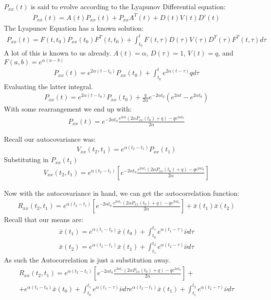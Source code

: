 \documentclass{article}
\begin{document}
$P_{xx}(t)$ is said to evolve according to the Lyapunov Differential equation:
\begin{align*}
\dot{P}_{xx}(t) = A(t)P_{xx}(t) + P_{xx}A^{T}(t) + D(t)V(t)D'(t)
\end{align*}
The Lyapunov Equation has a known solution:
\begin{align*}
P_{xx}(t) = F(t,t_0)P_{xx}(t_0)F^{T}(t,t_0) + \int_{t_0}^{t} F(t,\tau) D(\tau) V(\tau) D^T(\tau) F^T(t,\tau) d\tau
\end{align*}
A lot of this is known to us already. $A(t)=\alpha$, $D(\tau)=1$, $V(t)=q$, and $F(a,b)=e^{\alpha (a-b)}$
\begin{align*}
P_{xx}(t) = e^{2 \alpha (t-t_0)} P_{xx}(t_0) + \int_{t_0}^{t} e^{2 \alpha (t-\tau)} q d\tau
\end{align*}
Evaluating the latter integral.
\begin{align*}
P_{xx}(t) = e^{2 \alpha (t-t_0)} P_{xx}(t_0) + \frac{q}{2\alpha} e^{-2\alpha t_0} (e^{2\alpha t} - e^{2\alpha t_0})
\end{align*}
With some rearrangement we end up with:
\begin{align*}
P_{xx}(t) = e^{-2\alpha t_0} \frac{e^{2\alpha t} (2\alpha P_{xx}(t_0) + q) - q e^{2\alpha t_0}}{2\alpha}
\end{align*}



Recall our autocovariance was:
\begin{align*}
V_{xx}(t_2,t_1) = e^{\alpha (t_2-t_1)} P_{xx}(t_1)
\end{align*}
Substituting in $P_{xx}(t_1)$
\begin{align*}
V_{xx}(t_2,t_1) =  e^{\alpha (t_2-t_1)} [e^{-2\alpha t_0} \frac{e^{2\alpha t_1} (2\alpha P_{xx}(t_0) + q) - q e^{2\alpha t_0}}{2\alpha}]
\end{align*}


Now with the autocovariance in hand, we can get the autocorrelation function:
\begin{align*}
\boxed{ R_{xx}(t_2,t_1) = e^{\alpha (t_2-t_1)} [e^{-2\alpha t_0} \frac{e^{2\alpha t_1} (2\alpha P_{xx}(t_0) + q) - q e^{2\alpha t_0}}{2\alpha}] + \bar{x}(t_1)\bar{x}(t_2) }
\end{align*}
Recall that our means are:
\begin{align*}
\bar{x}(t_1) = e^{\alpha (t_1-t_0)}\bar{x}(t_0) + \int_{t_0}^{t_1} e^{\alpha (t_1-\tau)} \bar{\nu} d\tau \\
\bar{x}(t_2) = e^{\alpha (t_2-t_1)}\bar{x}(t_1) + \int_{t_1}^{t_2} e^{\alpha (t_2-\tau)} \bar{\nu} d\tau
\end{align*}
As such the Autocorrelation is just a substitution away.
\begin{align*}
R_{xx}(t_2,t_1) = e^{\alpha (t_2-t_1)} [e^{-2\alpha t_0} \frac{e^{2\alpha t_1} (2\alpha P_{xx}(t_0) + q) - q e^{2\alpha t_0}}{2\alpha}] + \\ 
+ e^{\alpha (t_1-t_0)}\bar{x}(t_0) + \int_{t_0}^{t_1} e^{\alpha (t_1-\tau)} \bar{\nu} d\tau e^{\alpha (t_2-t_1)}\bar{x}(t_1) + \int_{t_1}^{t_2} e^{\alpha (t_2-\tau)} \bar{\nu} d\tau
\end{align*}
\end{document}
